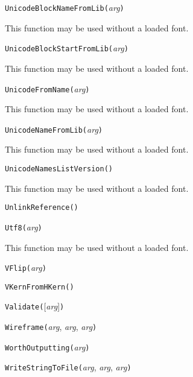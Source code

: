 
\noindent\texttt{UnicodeBlockNameFromLib(}\textit{arg}\texttt{)}

This function may be used without a loaded font.


\noindent\texttt{UnicodeBlockStartFromLib(}\textit{arg}\texttt{)}

This function may be used without a loaded font.


\noindent\texttt{UnicodeFromName(}\textit{arg}\texttt{)}

This function may be used without a loaded font.


\noindent\texttt{UnicodeNameFromLib(}\textit{arg}\texttt{)}

This function may be used without a loaded font.


\noindent\texttt{UnicodeNamesListVersion(}\texttt{)}

This function may be used without a loaded font.


\noindent\texttt{UnlinkReference(}\texttt{)}


\noindent\texttt{Utf8(}\textit{arg}\texttt{)}

This function may be used without a loaded font.


\noindent\texttt{VFlip(}\textit{arg}\texttt{)}


\noindent\texttt{VKernFromHKern(}\texttt{)}


\noindent\texttt{Validate(}[\textit{arg}]\texttt{)}


\noindent\texttt{Wireframe(}\textit{arg}, \textit{arg}, \textit{arg}\texttt{)}


\noindent\texttt{WorthOutputting(}\textit{arg}\texttt{)}


\noindent\texttt{WriteStringToFile(}\textit{arg}, \textit{arg}, \textit{arg}\texttt{)}

